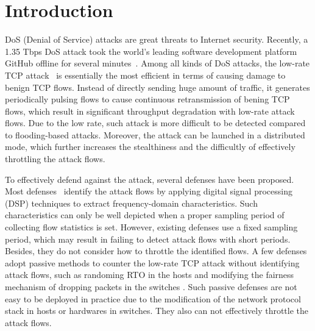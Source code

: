 \section{Introduction} 
DoS (Denial of Service) attacks are great threats to Internet security. Recently, a 1.35 Tbps DoS attack took the world's leading software development platform GitHub offline for several minutes~\cite{b19}. Among all kinds of DoS attacks, the low-rate TCP attack~\cite{b20} is essentially the most efficient in terms of causing damage to benign TCP flows. Instead of directly sending huge amount of traffic, it generates periodically pulsing flows to cause continuous retransmission of bening TCP flows, which result in significant throughput degradation with low-rate attack flows. Due to the low rate, such attack is more difficult to be detected compared to flooding-based attacks. Moreover, the attack can be launched in a distributed mode, which further increases the stealthiness and the difficultly of effectively throttling the attack flows.



 
To effectively defend against the attack, several defenses have been proposed. Most defenses~\cite{b1,b4, b6, b7, b22} identify the attack flows by applying digital signal processing (DSP) techniques to extract frequency-domain characteristics. Such characteristics can only be well depicted when a proper sampling period of collecting flow statistics is set. However, existing defenses use a fixed sampling period, which may result in failing to detect attack flows with short periods. Besides, they do not consider how to throttle the identified flows. A few defenses adopt passive methods to counter the low-rate TCP attack without identifying attack flows, such as randoming RTO  in the hosts \cite{b17} and modifying the fairness mechanism of dropping packets in the switches \cite{b8}. Such passive defenses are not easy to be deployed in practice due to the modification of the network protocol stack in hosts or hardwares in switches. They also can not effectively throttle the attack flows.

